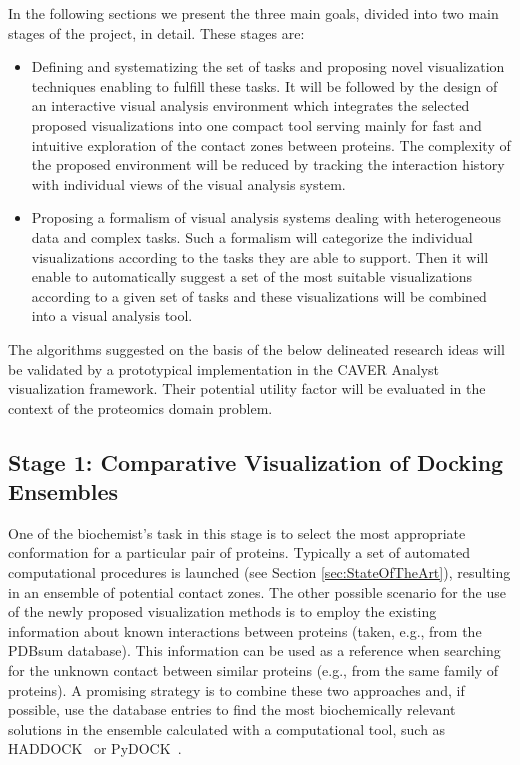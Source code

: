 \documentclass[11pt,a4paper,titlepage,oneside,onecolumn]{article}
\begin{document}
In the following sections we present the three main goals, divided into two main stages of the project, in detail. These stages are:
\begin{itemize}
\item Defining and systematizing the set of tasks and proposing novel visualization techniques enabling to fulfill these tasks. It will be followed by the design of an interactive visual analysis environment which integrates the selected proposed visualizations into one compact tool serving mainly for fast and intuitive exploration of the contact zones between proteins. The complexity of the proposed environment will be reduced by tracking the interaction history with individual views of the visual analysis system.
\item Proposing a formalism of visual analysis systems dealing with heterogeneous data and complex tasks. Such a formalism will categorize the individual visualizations according to the tasks they are able to support. Then it will enable to automatically suggest a set of the most suitable visualizations according to a given set of tasks and these visualizations will be combined into a visual analysis tool.
\end{itemize}

The algorithms suggested on the basis of the below delineated research ideas will be validated by a prototypical implementation in the CAVER Analyst visualization framework. 
Their potential utility factor will be evaluated in the context of the proteomics domain problem. 


\subsection{Stage 1: Comparative Visualization of Docking Ensembles}
One of the biochemist's task in this stage is to select the most appropriate conformation for a particular pair of proteins.
Typically a set of automated computational procedures is launched (see Section \ref{sec:StateOfTheArt}), resulting in an ensemble of potential contact zones.
The other possible scenario for the use of the newly proposed visualization methods is to employ the existing information about known interactions between proteins (taken, e.g., from the PDBsum database).
This information can be used as a reference when searching for the unknown contact between similar proteins (e.g., from the same family of proteins). 
A promising strategy is to combine these two approaches and, if possible, use the database entries to find the most biochemically relevant solutions in the ensemble calculated with a computational tool, such as HADDOCK~\cite{haddock} or PyDOCK~\cite{pydock}.
\end{document}

